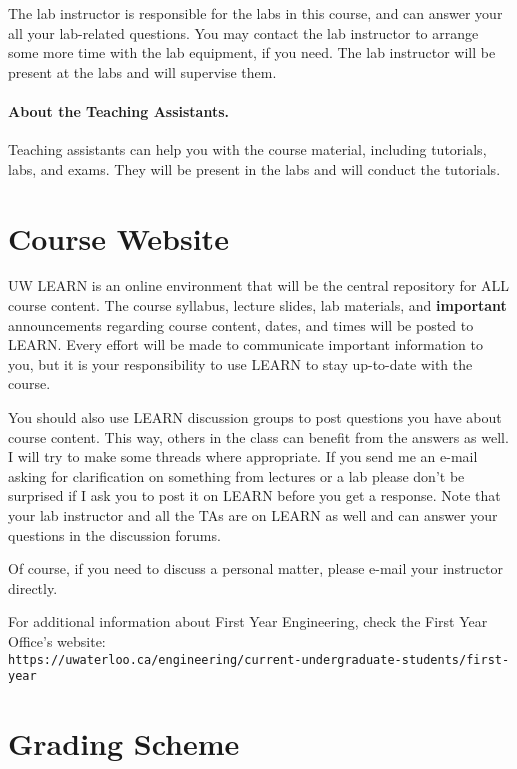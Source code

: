 \documentclass[letterpaper,10pt]{article}
\begin{document}
The lab instructor is responsible for the labs in this course, and can answer your all your lab-related questions. You may contact the lab instructor to arrange some more time with the lab equipment, if you need. The lab instructor will be present at the labs and will supervise them.

\paragraph{About the Teaching Assistants.}

Teaching assistants can help you with the course material, including tutorials, labs, and exams. They will be present in the labs and will conduct the tutorials.

\section*{Course Website}

UW LEARN is an online environment that will be the central repository for ALL course content. The course syllabus, lecture slides, lab materials, and \textbf{important} announcements regarding course content, dates, and times will be posted to LEARN. Every effort will be made to communicate important information to you, but it is your responsibility to use LEARN to stay up-to-date with the course.

You should also use LEARN discussion groups to post questions you have about course content. This way, others in the class can benefit from the answers as well. I will try to make some threads where appropriate. If you send me an e-mail asking for clarification on something from lectures or a lab please don't be surprised if I ask you to post it on LEARN before you get a response. Note that your lab instructor and all the TAs are on LEARN as well and can answer your questions in the discussion forums. 

Of course, if you need to discuss a personal matter, please e-mail your instructor directly.

For additional information about First Year Engineering, check the First Year Office's website: \\
\texttt{https://uwaterloo.ca/engineering/current-undergraduate-students/first-year}

\section*{Grading Scheme}
\end{document}
